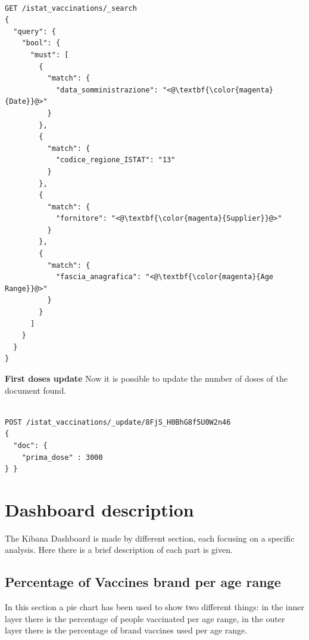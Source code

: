 \documentclass{article}
\begin{document}
\begin{lstlisting}[language=cypher, label=lst:cypher-example]

GET /istat_vaccinations/_search
{
  "query": {
    "bool": {
      "must": [
        {
          "match": {
            "data_somministrazione": "<@\textbf{\color{magenta}{Date}}@>"
          }
        },
        {
          "match": {
            "codice_regione_ISTAT": "13"
          }
        },
        {
          "match": {
            "fornitore": "<@\textbf{\color{magenta}{Supplier}}@>"
          }
        },
        {
          "match": {
            "fascia_anagrafica": "<@\textbf{\color{magenta}{Age Range}}@>"
          }
        }
      ]
    }
  }
}
\end{lstlisting}
\hfill\break
\textbf{First doses update}
\hfill\break
Now it is possible to update the number of doses of the document found.

\begin{lstlisting}[language=cypher, label=lst:cypher-example]

POST /istat_vaccinations/_update/8FjS_H0BhG8f5U0W2n46
{
  "doc": {
    "prima_dose" : 3000
} }

\end{lstlisting}
\newpage

\section{Dashboard description}
The Kibana Dashboard is made by different section, each focusing on a specific analysis.
Here there is a brief description of each part is given.

\subsection{Percentage of Vaccines brand per age range}
In this section a pie chart has been used to show two different things: in the inner layer there is the percentage of people vaccinated per age range, in the outer layer there is the percentage of brand vaccines used per age range.
\end{document}
